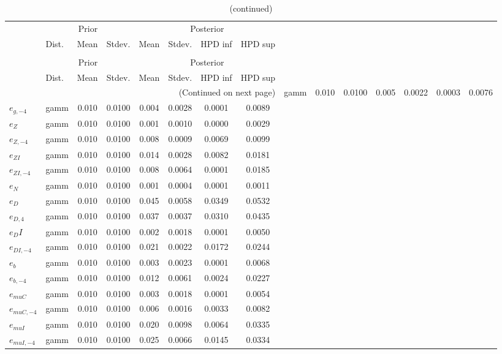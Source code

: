  
\begin{center}
\begin{longtable}{llcccccc} 
\caption{Results from Metropolis-Hastings (standard deviation of structural shocks)}
 \label{Table:MHPosterior:2}\\
\toprule 
  & \multicolumn{3}{c}{Prior}  &  \multicolumn{4}{c}{Posterior} \\
  \cmidrule(r{.75em}){2-4} \cmidrule(r{.75em}){5-8}
  & Dist. & Mean  & Stdev. & Mean & Stdev. & HPD inf & HPD sup\\
\midrule \endfirsthead 
\caption{(continued)}\\\toprule 
  & \multicolumn{3}{c}{Prior}  &  \multicolumn{4}{c}{Posterior} \\
  \cmidrule(r{.75em}){2-4} \cmidrule(r{.75em}){5-8}
  & Dist. & Mean  & Stdev. & Mean & Stdev. & HPD inf & HPD sup\\
\midrule \endhead 
\bottomrule \multicolumn{8}{r}{(Continued on next page)} \endfoot 
\bottomrule \endlastfoot 
${e_g}$ & gamm &   0.010 & 0.0100 &   0.005& 0.0022 &  0.0003 &  0.0076 \\ 
${e_{g,-4}}$ & gamm &   0.010 & 0.0100 &   0.004& 0.0028 &  0.0001 &  0.0089 \\ 
${e_Z}$ & gamm &   0.010 & 0.0100 &   0.001& 0.0010 &  0.0000 &  0.0029 \\ 
${e_{Z,-4}}$ & gamm &   0.010 & 0.0100 &   0.008& 0.0009 &  0.0069 &  0.0099 \\ 
${e_{ZI}}$ & gamm &   0.010 & 0.0100 &   0.014& 0.0028 &  0.0082 &  0.0181 \\ 
${e_{ZI,-4}}$ & gamm &   0.010 & 0.0100 &   0.008& 0.0064 &  0.0001 &  0.0185 \\ 
${e_N}$ & gamm &   0.010 & 0.0100 &   0.001& 0.0004 &  0.0001 &  0.0011 \\ 
${e_D}$ & gamm &   0.010 & 0.0100 &   0.045& 0.0058 &  0.0349 &  0.0532 \\ 
${e_{D,4}}$ & gamm &   0.010 & 0.0100 &   0.037& 0.0037 &  0.0310 &  0.0435 \\ 
${e_DI}$ & gamm &   0.010 & 0.0100 &   0.002& 0.0018 &  0.0001 &  0.0050 \\ 
${e_{DI,-4}}$ & gamm &   0.010 & 0.0100 &   0.021& 0.0022 &  0.0172 &  0.0244 \\ 
${e_b}$ & gamm &   0.010 & 0.0100 &   0.003& 0.0023 &  0.0001 &  0.0068 \\ 
${e_{b,-4}}$ & gamm &   0.010 & 0.0100 &   0.012& 0.0061 &  0.0024 &  0.0227 \\ 
${e_{muC}}$ & gamm &   0.010 & 0.0100 &   0.003& 0.0018 &  0.0001 &  0.0054 \\ 
${e_{muC,-4}}$ & gamm &   0.010 & 0.0100 &   0.006& 0.0016 &  0.0033 &  0.0082 \\ 
${e_{muI}}$ & gamm &   0.010 & 0.0100 &   0.020& 0.0098 &  0.0064 &  0.0335 \\ 
${e_{muI,-4}}$ & gamm &   0.010 & 0.0100 &   0.025& 0.0066 &  0.0145 &  0.0334 \\ 
\end{longtable}
 \end{center}

